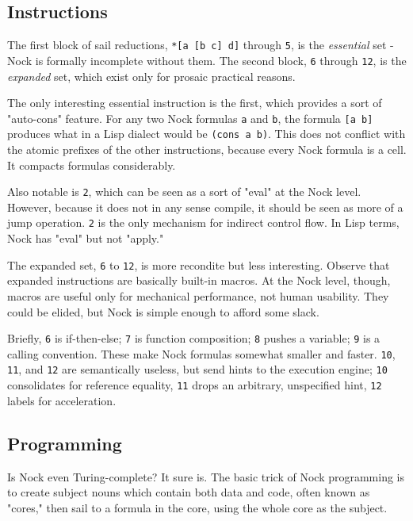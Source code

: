 \documentclass[10pt, nocopyrightspace]{sigplanconf}
\begin{document}
\subsection{Instructions}

The first block of sail reductions, \verb|*[a [b c] d]| through
\verb|5|, is
the \emph{essential} set - Nock is formally incomplete without them.
The second block, \verb|6| through \verb|12|, is the \emph{expanded} set, which
exist only for prosaic practical reasons.

The only interesting essential instruction is the first, which
provides a sort of "auto-cons" feature.  For any two Nock
formulas \verb|a| and \verb|b|, the formula \verb|[a b]| produces what in a
Lisp dialect would be \verb|(cons a b)|.  This does not conflict with
the atomic prefixes of the other instructions, because every
Nock formula is a cell.  It compacts formulas considerably.

Also notable is \verb|2|, which can be seen
as a sort of "eval" at the Nock level.  However, because it does
not in any sense compile, it should be seen as more of a jump
operation.  \verb|2| is the only mechanism for indirect control flow.
In Lisp terms, Nock has "eval" but not "apply."

The expanded set, \verb|6| to \verb|12|, is more recondite but less
interesting.  Observe that expanded instructions are basically
built-in macros.  At the Nock level, though, macros are
useful only for mechanical performance, not human usability.  They
could be elided, but Nock is simple enough to afford some slack.

Briefly, \verb|6| is if-then-else; \verb|7| is function
composition; \verb|8| pushes a
variable; \verb|9| is a calling convention.  These make Nock formulas
somewhat smaller and faster.  \verb|10|, \verb|11|, and \verb|12| are semantically
useless, but send hints to the
execution engine; \verb|10| consolidates for reference equality,
\verb|11|
drops an arbitrary, unspecified hint, \verb|12| labels for acceleration.

\subsection{Programming}

Is Nock even Turing-complete?  It sure is.  The basic trick of
Nock programming is to create subject nouns which contain both
data and code, often known as "cores," then sail to a formula in
the core, using the whole core as the subject.
\end{document}
